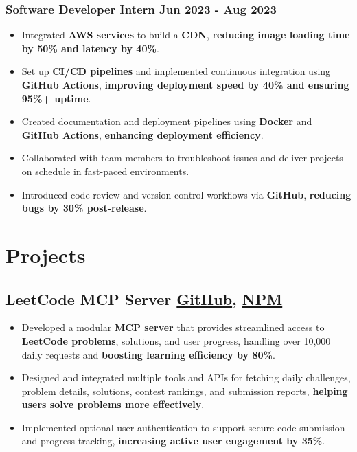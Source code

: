 \documentclass[10pt]{article}
\newcommand{\rside}[1]{
  \hfill {\small\color{accent} #1}%
}
\begin{document}
\subsubsection{Software Developer Intern \rside{Jun 2023 - Aug 2023}}
\begin{itemize}
  \item Integrated \textbf{AWS services} to build a \textbf{CDN}, \textbf{reducing image loading time by 50\% and latency by 40\%}.
  \item Set up \textbf{CI/CD pipelines} and implemented continuous integration using \textbf{GitHub Actions}, \textbf{improving deployment speed by 40\% and ensuring 95\%+ uptime}.
  \item Created documentation and deployment pipelines using \textbf{Docker} and \textbf{GitHub Actions}, \textbf{enhancing deployment efficiency}.
  \item Collaborated with team members to troubleshoot issues and deliver projects on schedule in fast-paced environments.
  \item Introduced code review and version control workflows via \textbf{GitHub}, \textbf{reducing bugs by 30\% post-release}.
\end{itemize}

\section{Projects}
\subsection{LeetCode MCP Server \rside{\href{https://github.com/ayushjaipuriyar/leetcode-mcpserver}{GitHub}\hspace{0.1cm}, \href{https://www.npmjs.com/package/leetcode-mcpserver}{NPM}}}
\begin{itemize}
  \item Developed a modular \textbf{MCP server} that provides streamlined access to \textbf{LeetCode problems}, solutions, and user progress, handling over 10,000 daily requests and \textbf{boosting learning efficiency by 80\%}.
  \item Designed and integrated multiple tools and APIs for fetching daily challenges, problem details, solutions, contest rankings, and submission reports, \textbf{helping users solve problems more effectively}.
  \item Implemented optional user authentication to support secure code submission and progress tracking, \textbf{increasing active user engagement by 35\%}.
\end{itemize}
\end{document}
